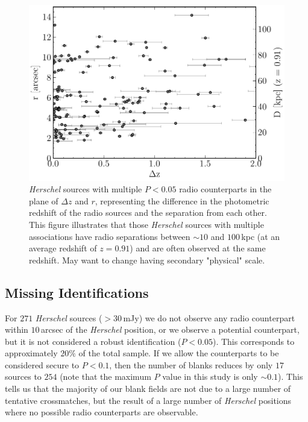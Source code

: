 \begin{figure}
	\centering
	\includegraphics[width=0.8\columnwidth]{Figures/multiples_separation.pdf}
	\caption[Physical separation between radio IDs for a single \textit{Herschel} source]{\textit{Herschel} sources with multiple $P < 0.05$ radio counterparts in the plane of $\Delta z$ and $r$, representing the difference in the photometric redshift of the radio sources and the separation from each other. This figure illustrates that those \textit{Herschel} sources with multiple associations have radio separations between $\sim 10$ and $100\,$kpc (at an average redshift of $z = 0.91$) and are often observed at the same redshift. {\color{red}May want to change having secondary "physical" scale.}}
	\label{fig:multiples_separation}
\end{figure}

\subsection{Missing Identifications}

For $271$ \textit{Herschel} sources ($> 30\,$mJy) we do not observe any radio counterpart within $10\,$arcsec of the \textit{Herschel} position, or we observe a potential counterpart, but it is not considered a robust identification ($P < 0.05$). This corresponds to approximately $20\%$ of the total sample. If we allow the counterparts to be considered secure to $P < 0.1$, then the number of blanks reduces by only $17$ sources to $254$ (note that the maximum $P$ value in this study is only $\sim 0.1$). This tells us that the majority of our blank fields are not due to a large number of tentative crossmatches, but the result of a large number of \textit{Herschel} positions where no possible radio counterparts are observable.

